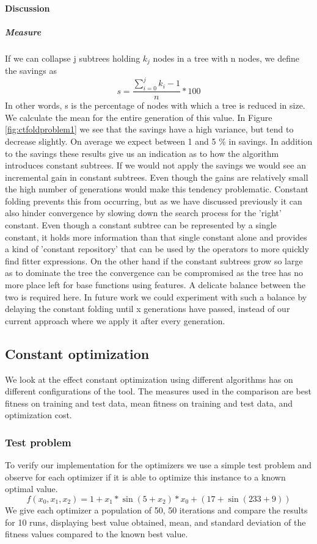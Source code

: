 \paragraph{Discussion}
\subparagraph{Measure}
If we can collapse j subtrees holding $k_j$ nodes in a tree with n nodes, we define the savings as 
\[
s = \frac{\sum_{i=0}^{j} k_i - 1}{n} * 100
\]
In other words, s is the percentage of nodes with which a tree is reduced in size.
We calculate the mean for the entire generation of this value.
In Figure \ref{fig:ctfoldproblem1} we see that the savings have a high variance, but tend to decrease slightly. On average we expect between 1 and 5 \% in savings. In addition to the savings these results give us an indication as to how the algorithm introduces constant subtrees. If we would not apply the savings we would see an incremental gain in constant subtrees. Even though the gains are relatively small the high number of generations would make this tendency problematic. 
Constant folding prevents this from occurring, but as we have discussed previously it can also hinder convergence by slowing down the search process for the 'right' constant. Even though a constant subtree can be represented by a single constant, it holds more information than that single constant alone and provides a kind of 'constant repository' that can be used by the operators to more quickly find fitter expressions. On the other hand if the constant subtrees grow so large as to dominate the tree the convergence can be compromised as the tree has no more place left for base functions using features. A delicate balance between the two is required here. In future work we could experiment with such a balance by delaying the constant folding until x generations have passed, instead of our current approach where we apply it after every generation. 

\subsection{Constant optimization}\label{subsec:optimizers}
We look at the effect constant optimization using different algorithms has on different configurations of the tool. The measures used in the comparison are best fitness on training and test data, mean fitness on training and test data, and optimization cost.

\subsubsection{Test problem}
To verify our implementation for the optimizers we use a simple test problem and observe for each optimizer if it is able to optimize this instance to a known optimal value.
\[
f(x_0, x_1, x_2) = 1 + x_1 * \sin (5+x_2) * x_0 + (17 + \sin (233+9))
\]
We give each optimizer a population of 50, 50 iterations and compare the results for 10 runs, displaying best value obtained, mean, and standard deviation of the fitness values compared to the known best value.
